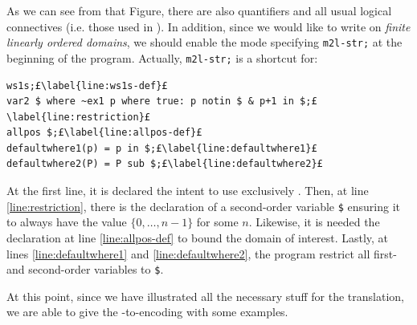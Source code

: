 As we can see from that Figure, there are also quantifiers and all usual logical connectives (i.e. those used in \FOL). In addition, since we would like to write \FOL on \textit{finite linearly ordered domains}, we should enable the \mls mode specifying \texttt{m2l-str;} at the beginning of the \MONA program. Actually, \texttt{m2l-str;} is a shortcut for:
\begin{lstlisting}[style=Mona, escapechar = £]
ws1s;£\label{line:ws1s-def}£
var2 $ where ~ex1 p where true: p notin $ & p+1 in $;£\label{line:restriction}£
allpos $;£\label{line:allpos-def}£
defaultwhere1(p) = p in $;£\label{line:defaultwhere1}£
defaultwhere2(P) = P sub $;£\label{line:defaultwhere2}£
\end{lstlisting}
At the first line, it is declared the intent to use exclusively \wsos. Then, at line \ref{line:restriction}, there is the declaration of a second-order variable \texttt{\$} ensuring it to always have the value $\{0,\dots, n-1\}$ for some $n$. Likewise, it is needed the declaration at line \ref{line:allpos-def} to bound the domain of interest. Lastly, at lines \ref{line:defaultwhere1} and \ref{line:defaultwhere2}, the program restrict all first- and second-order variables to \texttt{\$}.

At this point, since we have illustrated all the necessary stuff for the translation, we are able to give the \FOL-to-\MONA encoding with some examples.

